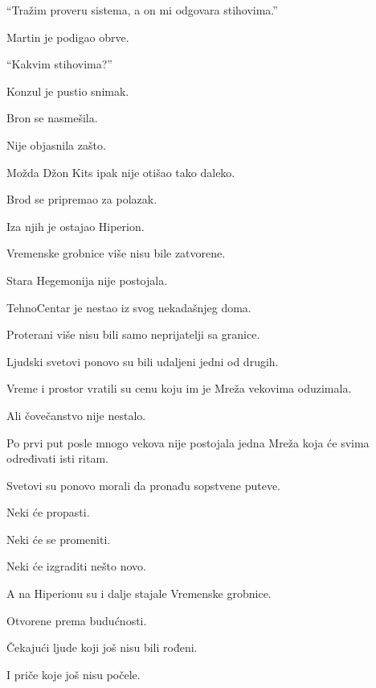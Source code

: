 ``Tražim proveru sistema, a on mi odgovara stihovima.''

Martin je podigao obrve.

``Kakvim stihovima?''

Konzul je pustio snimak.

Bron se nasmešila.

Nije objasnila zašto.

\bigskip

Možda Džon Kits ipak nije otišao tako daleko.

\bigskip

Brod se pripremao za polazak.

Iza njih je ostajao Hiperion.

Vremenske grobnice više nisu bile zatvorene.

Stara Hegemonija nije postojala.

TehnoCentar je nestao iz svog nekadašnjeg doma.

Proterani više nisu bili samo neprijatelji sa granice.

Ljudski svetovi ponovo su bili udaljeni jedni od drugih.

Vreme i prostor vratili su cenu koju im je Mreža vekovima oduzimala.

\bigskip

Ali čovečanstvo nije nestalo.

Po prvi put posle mnogo vekova nije postojala jedna Mreža koja će svima određivati isti ritam.

Svetovi su ponovo morali da pronađu sopstvene puteve.

Neki će propasti.

Neki će se promeniti.

Neki će izgraditi nešto novo.

\bigskip

A na Hiperionu su i dalje stajale Vremenske grobnice.

Otvorene prema budućnosti.

Čekajući ljude koji još nisu bili rođeni.

I priče koje još nisu počele.